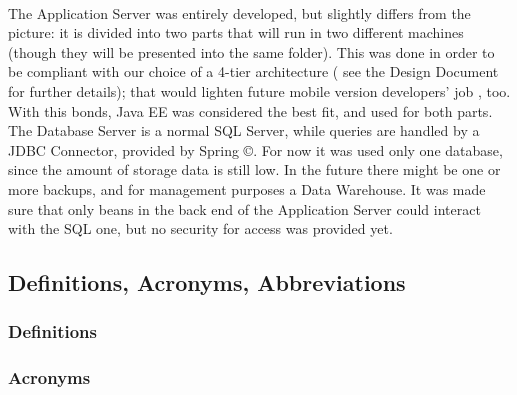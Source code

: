 \documentclass{article}
\begin{document}
			\paragraph{}The Application Server was entirely developed, but slightly differs from the picture: it is divided into two parts that will run in two different machines (though they will be presented into the same folder). This was done in order to be compliant with our choice of a 4-tier architecture ( see the Design Document for further details); that would lighten future mobile version developers’ job , too. With this bonds, Java EE was considered the best fit, and used for both parts. The Database Server is a normal SQL Server, while queries are handled by a JDBC Connector, provided by Spring ©. For now it was used only one database, since the amount of storage data is still low. In the future there might be one or more backups, and for management purposes a Data Warehouse. It was made sure that only beans in the back end of the Application Server could interact with the SQL one, but no security for access was provided yet.
		\subsection{Definitions, Acronyms, Abbreviations}
			\subsubsection{Definitions}
			\subsubsection{Acronyms}
\end{document}
